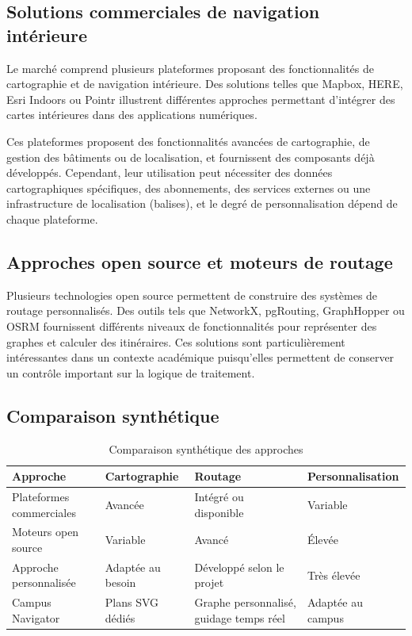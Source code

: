 \documentclass[12pt,a4paper]{report}
\begin{document}
\subsection{Solutions commerciales de navigation intérieure}

Le marché comprend plusieurs plateformes proposant des fonctionnalités de cartographie et de
navigation intérieure. Des solutions telles que Mapbox, HERE, Esri Indoors ou Pointr illustrent
différentes approches permettant d'intégrer des cartes intérieures dans des applications
numériques.

Ces plateformes proposent des fonctionnalités avancées de cartographie, de gestion des bâtiments
ou de localisation, et fournissent des composants déjà développés. Cependant, leur utilisation peut
nécessiter des données cartographiques spécifiques, des abonnements, des services externes ou une
infrastructure de localisation (balises), et le degré de personnalisation dépend de chaque
plateforme.

\subsection{Approches open source et moteurs de routage}

Plusieurs technologies open source permettent de construire des systèmes de routage personnalisés.
Des outils tels que NetworkX, pgRouting, GraphHopper ou OSRM fournissent différents niveaux de
fonctionnalités pour représenter des graphes et calculer des itinéraires. Ces solutions sont
particulièrement intéressantes dans un contexte académique puisqu'elles permettent de conserver un
contrôle important sur la logique de traitement.

\subsection{Comparaison synthétique}

\begin{table}[h]
\centering
\caption{Comparaison synthétique des approches}
\label{tab:compar}
\small
\begin{tabularx}{\linewidth}{|X|X|X|X|}
\hline
\textbf{Approche} & \textbf{Cartographie} & \textbf{Routage} & \textbf{Personnalisation}\\
\hline
Plateformes commerciales & Avancée & Intégré ou disponible & Variable\\
\hline
Moteurs open source & Variable & Avancé & Élevée\\
\hline
Approche personnalisée & Adaptée au besoin & Développé selon le projet & Très élevée\\
\hline
Campus Navigator & Plans SVG dédiés & Graphe personnalisé, guidage temps réel & Adaptée au campus\\
\hline
\end{tabularx}
\end{table}
\end{document}
